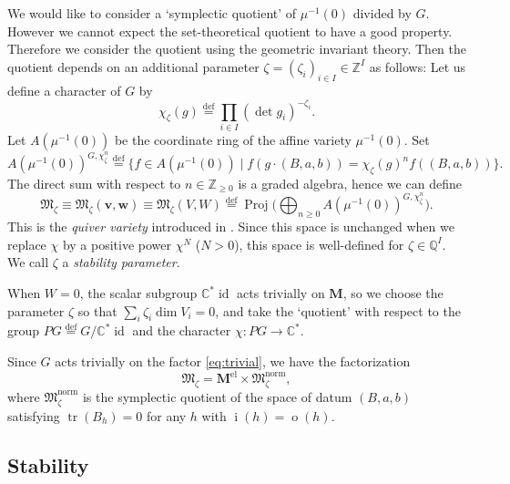 \documentclass[10pt,a4paper]{amsart}
\theoremstyle{definition}
\numberwithin{equation}{section}
\newcommand{\defeq}{\overset{\operatorname{\scriptstyle def}}{=}}
\newcommand{\C}{{\mathbb C}}
\newcommand{\Z}{{\mathbb Z}}
\newcommand{\Q}{{\mathbb Q}}
\newcommand{\tr}{\operatorname{tr}}
\newcommand{\vin}[1]{\operatorname{i}(#1)} %
\newcommand{\vout}[1]{\operatorname{o}(#1)} %
\newcommand{\bM}{{\mathbf M}} %
\newcommand{\M}{{\mathfrak M}} %
\newcommand{\bv}{{\mathbf v}} %
\newcommand{\bw}{{\mathbf w}} %
\begin{document}
We would like to consider a `symplectic quotient' of $\mu^{-1}(0)$
divided by $G$.
However we cannot expect the set-theoretical quotient
to have a good property. Therefore we consider the quotient using the
geometric invariant theory. Then the quotient depends on an additional
parameter $\zeta = (\zeta_i)_{i\in I}\in \Z^I$ as follows:
%
Let us def\/ine a character of $G$ by
\begin{equation*}
  \chi_\zeta(g) \defeq \prod_{i\in I} \left(\det g_i\right)^{-\zeta_i}.
\end{equation*}
Let $A(\mu^{-1}(0))$ be the coordinate ring of the af\/f\/ine variety
$\mu^{-1}(0)$. Set
\begin{equation*}
   A(\mu^{-1}(0))^{G,\chi_\zeta^n}
   \defeq \{ f\in A(\mu^{-1}(0)) \mid f(g\cdot(B,a,b))
   = \chi_\zeta(g)^n f((B,a,b)) \}.
\end{equation*}
The direct sum with respect to $n\in\Z_{\ge 0}$ is a graded algebra,
hence we can def\/ine
\begin{equation*}
   \M_\zeta \equiv \M_\zeta(\bv,\bw) \equiv \M_\zeta(V,W)
   \defeq \operatorname{Proj}\Big(\bigoplus_{n\ge 0}
   A(\mu^{-1}(0))^{G,\chi_\zeta^n}\Big).
\end{equation*}
This is the {\it quiver variety\/} introduced in \cite{Na-quiver}.
Since this space is unchanged when we replace $\chi$ by a positive power
$\chi^N$ ($N > 0$), this space is well-def\/ined for $\zeta\in \Q^I$.
We call $\zeta$ a {\it stability parameter}.

When $W = 0$, the scalar subgroup $\C^*\operatorname{id}$ acts
trivially on $\bM$, so we choose the parameter $\zeta$ so that
$\sum_i \zeta_i \dim V_i = 0$, and take the `quotient' with respect to
the group $PG \defeq G/\C^*\operatorname{id}$ and the character
$\chi\colon PG\to \C^*$.

Since $G$ acts trivially on the factor \eqref{eq:trivial}, we have the
factorization
\begin{equation}\label{eq:fac}
    \M_\zeta = \bM^{\text{el}} \times \M_\zeta^{\text{norm}},
\end{equation}
where $\M_\zeta^{\text{norm}}$ is the symplectic quotient of the space
of datum $(B,a,b)$ satisfying $\tr(B_h) = 0$ for any $h$ with $\vin{h}
= \vout{h}$.

\subsection{Stability}\label{subsec:stability}
\end{document}

